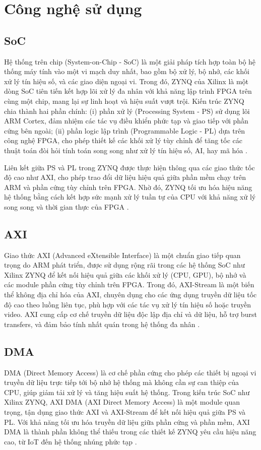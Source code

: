\documentclass[../DoAn.tex]{subfiles}
\begin{document}
\section{Công nghệ sử dụng}

\subsection{SoC}

Hệ thống trên chip (System-on-Chip - SoC) là một giải pháp tích hợp toàn bộ hệ thống máy tính vào một vi mạch duy nhất, bao gồm bộ xử lý, bộ nhớ, các khối xử lý tín hiệu số, và các giao diện ngoại vi. Trong đó, ZYNQ của Xilinx là một dòng SoC tiên tiến kết hợp lõi xử lý đa nhân với khả năng lập trình FPGA trên cùng một chip, mang lại sự linh hoạt và hiệu suất vượt trội. Kiến trúc ZYNQ chia thành hai phần chính: (i) phần xử lý (Processing System - PS) sử dụng lõi ARM Cortex, đảm nhiệm các tác vụ điều khiển phức tạp và giao tiếp với phần cứng bên ngoài; (ii) phần logic lập trình (Programmable Logic - PL) dựa trên công nghệ FPGA, cho phép thiết kế các khối xử lý tùy chỉnh để tăng tốc các thuật toán đòi hỏi tính toán song song như xử lý tín hiệu số, AI, hay mã hóa \cite{noauthor_amd_nodate}.

Liên kết giữa PS và PL trong ZYNQ được thực hiện thông qua các giao thức tốc độ cao như AXI, cho phép trao đổi dữ liệu hiệu quả giữa phần mềm chạy trên ARM và phần cứng tùy chỉnh trên FPGA. Nhờ đó, ZYNQ tối ưu hóa hiệu năng hệ thống bằng cách kết hợp sức mạnh xử lý tuần tự của CPU với khả năng xử lý song song và thời gian thực của FPGA \cite{noauthor_zynq-7000_2019}.

\subsection{AXI}
Giao thức AXI (Advanced eXtensible Interface) là một chuẩn giao tiếp quan trọng do ARM phát triển, được sử dụng rộng rãi trong các hệ thống SoC như Xilinx ZYNQ để kết nối hiệu quả giữa các khối xử lý (CPU, GPU), bộ nhớ và các module phần cứng tùy chỉnh trên FPGA. Trong đó, AXI-Stream là một biến thể không địa chỉ hóa của AXI, chuyên dụng cho các ứng dụng truyền dữ liệu tốc độ cao theo luồng liên tục, phù hợp với các tác vụ xử lý tín hiệu số hoặc truyền video. AXI cung cấp cơ chế truyền dữ liệu độc lập địa chỉ và dữ liệu, hỗ trợ burst transfers, và đảm bảo tính nhất quán trong hệ thống đa nhân \cite{noauthor_amba_nodate}.

\subsection{DMA}
DMA (Direct Memory Access) là cơ chế phần cứng cho phép các thiết bị ngoại vi truyền dữ liệu trực tiếp tới bộ nhớ hệ thống mà không cần sự can thiệp của CPU, giúp giảm tải xử lý và tăng hiệu suất hệ thống. Trong kiến trúc SoC như Xilinx ZYNQ, AXI DMA (AXI Direct Memory Access) là một module quan trọng, tận dụng giao thức AXI và AXI-Stream để kết nối hiệu quả giữa PS và PL. Với khả năng tối ưu hóa truyền dữ liệu giữa phần cứng và phần mềm, AXI DMA là thành phần không thể thiếu trong các thiết kế ZYNQ yêu cầu hiệu năng cao, từ IoT đến hệ thống nhúng phức tạp \cite{noauthor_introduction_nodate}.
\end{document}
